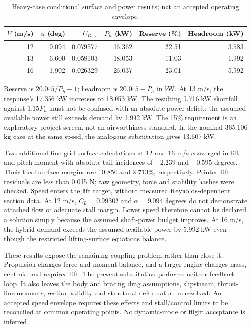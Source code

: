 \documentclass[11pt,a4paper]{article}
\begin{document}
\begin{table}[htbp]
\centering\small
\caption{Heavy-case conditional surface and power results; not an accepted operating envelope.}
\label{tab:v16_speed_power}
\begin{tabular}{rrrrrr}
\hline
$V$ (m/s)&$\alpha$ (deg)&$C_{D_i,s}$&$P_h$ (kW)&Reserve (\%)&Headroom (kW)\\
\hline
12 & 9.094 & 0.079577 & 16.362 & 22.51 & 3.683\\
13 & 6.600 & 0.058103 & 18.053 & 11.03 & 1.992\\
16 & 1.902 & 0.026329 & 26.037 & -23.01 & -5.992\\
\hline
\end{tabular}
\end{table}

Reserve is $20.045/P_h-1$; headroom is $20.045-P_h$ in kW. At 13 m/s,
the response's 17.356 kW increases to 18.053 kW. The resulting 0.716 kW shortfall
against $1.15P_h$ must not be confused with an absolute power deficit: the assumed
available power still exceeds demand by 1.992 kW. The 15\% requirement is an
exploratory project screen, not an airworthiness standard. In the nominal
365.106 kg case at the same speed, the analogous substitution gives 13.607 kW.

Two additional fine-grid surface calculations at 12 and 16 m/s converged in lift
and pitch moment with absolute tail incidences of $-2.239$ and $-0.595$ degrees.
Their local surface margins are 10.850 and 8.713\%, respectively. Printed lift
residuals are less than 0.015 N; raw geometry, force and stability hashes were
checked. Speed enters the lift target, without measured Reynolds-dependent
section data. At 12 m/s, $C_L=0.99302$ and $\alpha=9.094$ degrees do not demonstrate
attached flow or adequate stall margin. Lower speed therefore cannot be declared
a solution simply because the assumed shaft-power budget improves. At 16 m/s,
the hybrid demand exceeds the assumed available power by 5.992 kW even though
the restricted lifting-surface equations balance.

These results expose the remaining coupling problem rather than close it.
Propulsion changes force and moment balance, and a larger engine changes mass,
centroid and required lift. The present substitution performs neither feedback
loop. It also leaves the body and bracing drag assumptions, slipstream, thrust-line
moments, section validity and structural deformation unresolved. An accepted
speed envelope requires these effects and stall/control limits to be reconciled
at common operating points. No dynamic-mode or flight acceptance is inferred.
\end{document}
